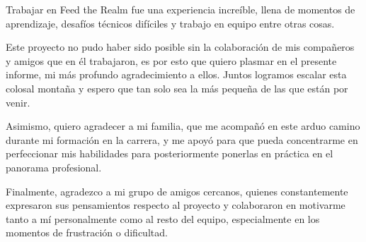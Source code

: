 Trabajar en Feed the Realm fue una experiencia increíble, llena de momentos de aprendizaje, desafíos técnicos difíciles y trabajo en equipo
entre otras cosas.

\vspace{0.25cm}

Este proyecto no pudo haber sido posible sin la colaboración de mis compañeros y amigos que en él trabajaron, es por esto
que quiero plasmar en el presente informe, mi más profundo agradecimiento a ellos. Juntos logramos escalar esta colosal montaña
y espero que tan solo sea la más pequeña de las que están por venir.

Asimismo, quiero agradecer a mi familia, que me acompañó en este arduo camino durante mi formación en la carrera,
y me apoyó para que pueda concentrarme en perfeccionar mis habilidades para posteriormente ponerlas en práctica
en el panorama profesional.

Finalmente, agradezco a mi grupo de amigos cercanos, quienes constantemente expresaron sus pensamientos respecto al proyecto
y colaboraron en motivarme tanto a mí personalmente como al resto del equipo, especialmente en los momentos de frustración o dificultad.
